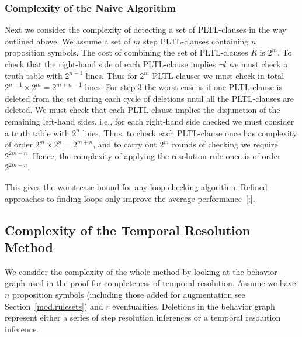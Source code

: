 \documentclass[nohyperref]{acmtrans2f}
\begin{document}
\subsubsection{Complexity of the Naive Algorithm}
%
Next we consider the complexity of detecting a set of PLTL-clauses in the way
outlined above. We assume a set of $m$ step PLTL-clauses containing $n$
proposition symbols.  The cost of combining the set of PLTL-clauses $R$ is $2^m$. To
check that the right-hand side of each PLTL-clause implies $\neg l$ 
we must check a truth table with
$2^{n-1}$ lines. Thus for $2^m$ PLTL-clauses we must check in total $2^{n-1}
\times 2^m = 2^{m+n-1}$ lines.  For step 3 the worst case is if one
PLTL-clause is deleted from the set during each cycle of deletions until all
the PLTL-clauses are deleted. We must check that each PLTL-clause implies
the disjunction 
of the remaining left-hand sides, i.e., for each right-hand side
checked we must consider a truth table with $2^n$ lines. Thus, to
check each PLTL-clause once has complexity of order $2^m \times 2^n =
2^{m+n}$, and to carry out $2^m$ rounds of checking we require $2^{2m
+n}$. Hence, the complexity of applying the resolution rule once is of
order $2^{2m +n}$.

This gives the worst-case bound for any loop checking algorithm.
Refined approaches to finding loops only improve the
average performance~[;].

\subsection{Complexity of the Temporal Resolution Method}
%
We consider the complexity of the whole method by looking at the behavior
graph used in the proof for completeness of temporal resolution. Assume we
have $n$ proposition symbols (including those added for augmentation see
Section~\ref{mod.rulesets}) and $r$ eventualities. 
Deletions in the behavior graph represent either a series of step
resolution inferences or a temporal resolution inference.
\end{document}

